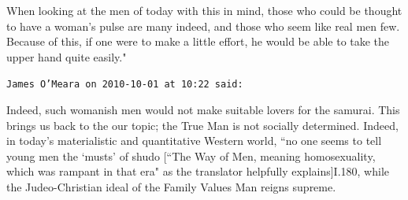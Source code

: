 \begin{footnotesize}
\begin{sffamily}
When looking at the men of today with this in mind, those who could be thought to have a woman's pulse are many indeed, and those who seem like real men few. Because of this, if one were to make a little effort, he would be able to take the upper hand quite easily."


\hfill

\texttt{James O'Meara on 2010-10-01 at 10:22 said: }

Indeed, such womanish men would not make suitable lovers for the samurai. This brings us back to the our topic; the True Man is not socially determined. Indeed, in today's materialistic and quantitative Western world, ``no one seems to tell young men the `musts' of shudo [``The Way of Men, meaning homosexuality, which was rampant in that era" as the translator helpfully explains]I.180, while the Judeo-Christian ideal of the Family Values Man reigns supreme.


\end{sffamily}\end{footnotesize}
